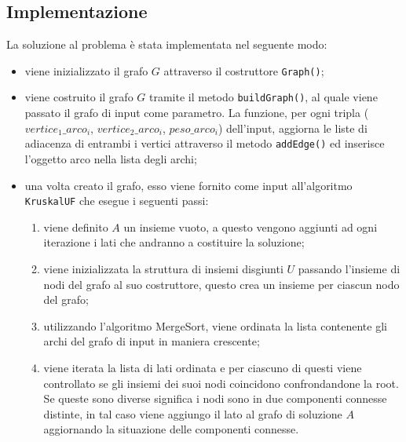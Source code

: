 	\subsection{Implementazione}
		La soluzione al problema è stata implementata nel seguente modo:
		\begin{itemize}
			\item viene inizializzato il grafo $G$ attraverso il costruttore \texttt{Graph()};
			\item viene costruito il grafo $G$ tramite il metodo \texttt{buildGraph()}, al quale viene passato il grafo di input come parametro.
			La funzione, per ogni tripla ($vertice_1\_arco_i$, $vertice_2\_arco_i$, $peso\_arco_i$) dell'input, aggiorna le liste di adiacenza di entrambi i vertici attraverso il metodo \texttt{addEdge()} ed inserisce l'oggetto arco nella lista degli archi; 
			\item una volta creato il grafo, esso viene fornito come input all'algoritmo \texttt{KruskalUF} che esegue i seguenti passi:
			\begin{enumerate}  				
				\item viene definito $A$ un insieme vuoto, a questo vengono aggiunti ad ogni iterazione i lati che andranno a costituire la soluzione;
				\item viene inizializzata la struttura di insiemi disgiunti $U$ passando l'insieme di nodi del grafo al suo costruttore, questo crea un insieme per ciascun nodo del grafo;
				\item utilizzando l'algoritmo MergeSort, viene ordinata la lista contenente gli archi del grafo di input in maniera crescente;		
				\item viene iterata la lista di lati ordinata e per ciascuno di questi viene controllato se gli insiemi dei suoi nodi coincidono confrondandone la root. Se queste sono diverse significa i nodi sono in due componenti connesse distinte, in tal caso viene aggiungo il lato al grafo di soluzione $A$ aggiornando la situazione delle componenti connesse.
			\end{enumerate}
		\end{itemize}
	
